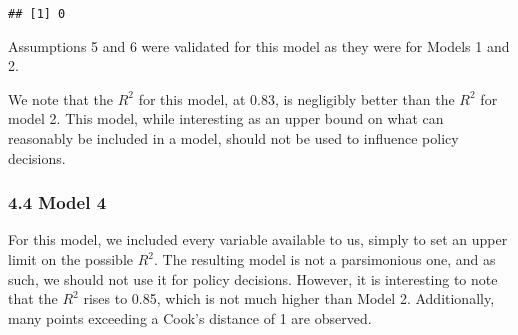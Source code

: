 \documentclass[]{article}
\newenvironment{Shaded}{\begin{snugshade}}{\end{snugshade}}
\newcommand{\KeywordTok}[1]{\textcolor[rgb]{0.13,0.29,0.53}{\textbf{#1}}}
\newcommand{\DecValTok}[1]{\textcolor[rgb]{0.00,0.00,0.81}{#1}}
\newcommand{\StringTok}[1]{\textcolor[rgb]{0.31,0.60,0.02}{#1}}
\newcommand{\OperatorTok}[1]{\textcolor[rgb]{0.81,0.36,0.00}{\textbf{#1}}}
\newcommand{\NormalTok}[1]{#1}
\begin{document}
\begin{Shaded}
\end{Shaded}

\begin{verbatim}
## [1] 0
\end{verbatim}

Assumptions 5 and 6 were validated for this model as they were for
Models 1 and 2.

We note that the \(R^2\) for this model, at 0.83, is negligibly better
than the \(R^2\) for model 2. This model, while interesting as an upper
bound on what can reasonably be included in a model, should not be used
to influence policy decisions.

\subsubsection{4.4 Model 4}\label{model-4}

For this model, we included every variable available to us, simply to
set an upper limit on the possible \(R^2\). The resulting model is not a
parsimonious one, and as such, we should not use it for policy
decisions. However, it is interesting to note that the \(R^2\) rises to
0.85, which is not much higher than Model 2. Additionally, many points
exceeding a Cook's distance of 1 are observed.
\end{document}
